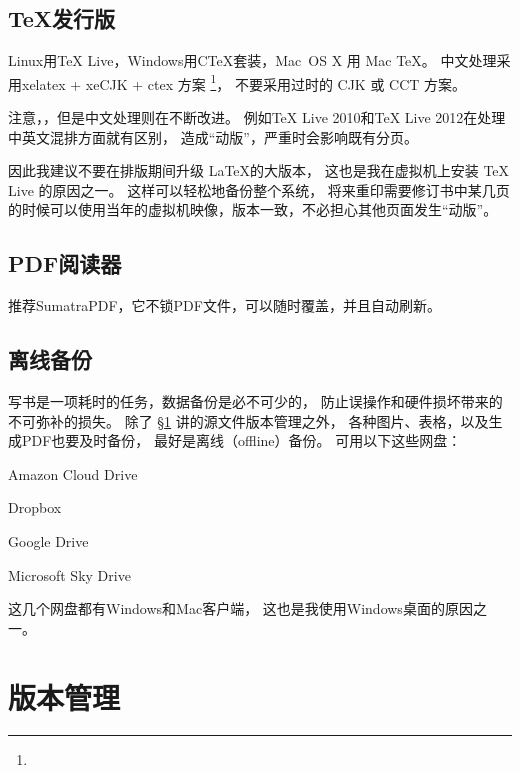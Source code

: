 \subsection{\TeX 发行版}
Linux用TeX Live，Windows用CTeX套装，Mac~OS X 用 Mac TeX。
中文处理采用xelatex + xeCJK + ctex 方案
\footnote{}，
不要采用过时的 CJK 或 CCT 方案。

注意，，但是中文处理则在不断改进。
例如TeX Live 2010和TeX Live 2012在处理中英文混排方面就有区别，
造成“动版”，严重时会影响既有分页。

\vspace{1ex}
\centerline{}

\vspace{1ex}
\centerline{}

\vspace{1ex}
因此我建议不要在排版期间升级 \LaTeX 的大版本，
这也是我在虚拟机上安装 TeX Live 的原因之一。
这样可以轻松地备份整个系统，
将来重印需要修订书中某几页的时候可以使用当年的虚拟机映像，版本一致，不必担心其他页面发生“动版”。

\subsection{PDF阅读器}
推荐SumatraPDF，它不锁PDF文件，可以随时覆盖，并且自动刷新。

\subsection{离线备份}
写书是一项耗时的任务，数据备份是必不可少的，
防止误操作和硬件损坏带来的不可弥补的损失。
除了 \S \ref{sec:versionControl} 讲的源文件版本管理之外，
各种图片、表格，以及生成PDF也要及时备份，
最好是离线（offline）备份。
可用以下这些网盘：

\begindot
\item Amazon Cloud Drive
\item Dropbox
\item Google Drive
\item Microsoft Sky Drive
\myenddot

这几个网盘都有Windows和Mac客户端，
这也是我使用Windows桌面的原因之一。

\section{版本管理}
\label{sec:versionControl}


